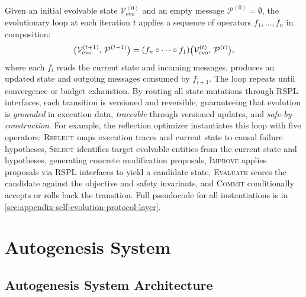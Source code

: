 \documentclass{article}
\theoremstyle{plain}
\theoremstyle{definition}
\theoremstyle{remark}
\begin{document}
Given an initial evolvable state $\mathcal{V}_{\text{evo}}^{(0)}$ and an empty message $\mathcal{P}^{(0)} = \emptyset$, the evolutionary loop at each iteration $t$ applies a sequence of operators $f_1, \ldots, f_n$ in composition:
\begin{equation}
\footnotesize
\bigl(\mathcal{V}_{\text{evo}}^{(t+1)},\, \mathcal{P}^{(t+1)}\bigr) = (f_n \circ \cdots \circ f_1)\bigl(\mathcal{V}_{\text{evo}}^{(t)},\, \mathcal{P}^{(t)}\bigr),
\end{equation}
where each $f_i$ reads the current state and incoming messages, produces an updated state and outgoing messages consumed by $f_{i+1}$. The loop repeats until convergence or budget exhaustion. By routing all state mutations through RSPL interfaces, each transition is versioned and reversible, guaranteeing that evolution is \emph{grounded} in execution data, \emph{traceable} through versioned updates, and \emph{safe-by-construction}. For example, the reflection optimizer instantiates this loop with five operators: \textsc{Reflect} maps execution traces and current state to causal failure hypotheses, \textsc{Select} identifies target evolvable entities from the current state and hypotheses, generating concrete modification proposals, \textsc{Improve} applies proposals via RSPL interfaces to yield a candidate state, \textsc{Evaluate} scores the candidate against the objective and safety invariants, and \textsc{Commit} conditionally accepts or rolls back the transition. Full pseudocode for all instantiations is in \cref{sec:appendix-self-evolution-protocol-layer}.

\vspace{-0.2cm}
\section{Autogenesis System}
\label{sec:system}

\vspace{-0.2cm}
\subsection{Autogenesis System Architecture}
\vspace{-0.2cm}
\end{document}
